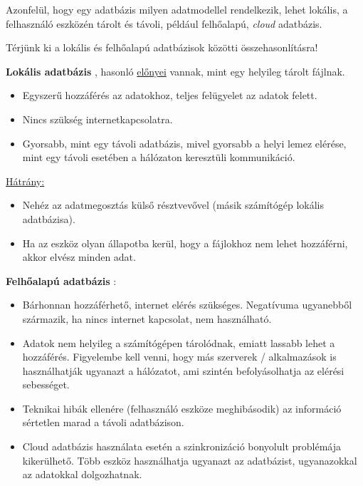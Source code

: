 
\vspace{10pt}
\noindent Azonfelül, hogy egy adatbázis milyen adatmodellel rendelkezik, lehet lokális, a felhasználó eszközén tárolt és távoli, például felhőalapú, \textit{cloud} adatbázis.

Térjünk ki a lokális és felhőalapú adatbázisok közötti összehasonlításra!

\noindent \textbf{Lokális adatbázis} \cite{enwiki:1085248519}, hasonló \underline{előnyei} vannak, mint egy helyileg tárolt fájlnak.
\begin{itemize}
	\item Egyszerű hozzáférés az adatokhoz, teljes felügyelet az adatok felett.
	\item Nincs szükség internetkapcsolatra.
	\item Gyorsabb, mint egy távoli adatbázis, mivel gyorsabb a helyi lemez elérése, mint egy távoli esetében a hálózaton keresztüli kommunikáció.
\end{itemize}

\noindent \underline{Hátrány:}
\begin{itemize}
	\item Nehéz az adatmegosztás külső résztvevővel (másik számítógép lokális adatbázisa).
	\item Ha az eszköz olyan állapotba kerül, hogy a fájlokhoz nem lehet hozzáférni, akkor elvész minden adat.
\end{itemize}

\newpage \noindent \textbf{Felhőalapú adatbázis} \cite{chandra2012study}:
\begin{itemize}
	\item Bárhonnan hozzáférhető, internet elérés szükséges. Negatívuma ugyanebből származik, ha nincs internet kapcsolat, nem használható.
	\item Adatok nem helyileg a számítógépen tárolódnak, emiatt lassabb lehet a hozzáférés. Figyelembe kell venni, hogy más szerverek / alkalmazások is használhatják ugyanazt a hálózatot, ami szintén befolyásolhatja az elérési sebességet.
	\item Teknikai hibák ellenére (felhasználó eszköze meghibásodik) az információ sértetlen marad a távoli adatbázison.
	\item Cloud adatbázis használata esetén a szinkronizáció bonyolult problémája kikerülhető. Több eszköz használhatja ugyanazt az adatbázist, ugyanazokkal az adatokkal dolgozhatnak.
\end{itemize}

